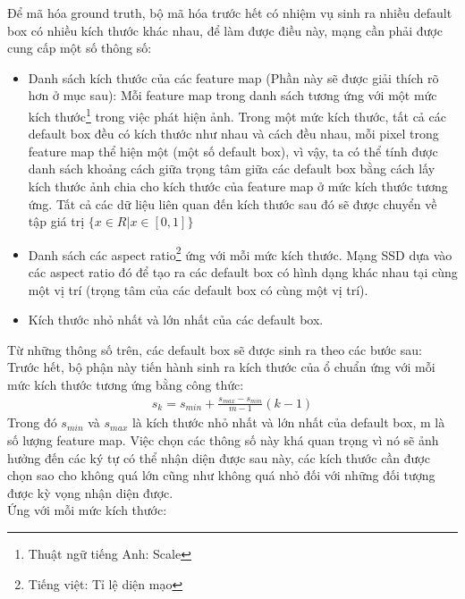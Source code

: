 \documentclass[a4paper,12pt]{article}
\begin{document}
	Để mã hóa ground truth, bộ mã hóa trước hết có nhiệm vụ sinh ra nhiều default box có nhiều kích thước khác nhau, để làm được điều này, mạng cần phải được cung cấp một số thông số:\\
	\begin{itemize}
		\item Danh sách kích thước của các feature map (Phần này sẽ được giải thích rõ hơn ở mục sau): Mỗi feature map trong danh sách tương ứng với một mức kích thước\footnote{Thuật ngữ tiếng Anh: Scale} trong việc phát hiện ảnh. Trong một mức kích thước, tất cả các default box đều có kích thước như nhau và cách đều nhau, mỗi pixel trong feature map thể hiện một (một số default box), vì vậy, ta có thể tính được danh sách khoảng cách giữa trọng tâm giữa các default box bằng cách lấy kích thước ảnh chia cho kích thước của feature map ở mức kích thước tương ứng. Tất cả các dữ liệu liên quan đến kích thước sau đó sẽ được chuyển về tập giá trị $\{x \in R | x \in [0, 1] \} $ 
		\item Danh sách các aspect ratio\footnote{Tiếng việt: Tỉ lệ diện mạo} ứng với mỗi mức kích thước. Mạng SSD dựa vào các aspect ratio đó để tạo ra các default box có hình dạng khác nhau tại cùng một vị trí (trọng tâm của các default box có cùng một vị trí).
		\item Kích thước nhỏ nhất và lớn nhất của các default box.
	\end{itemize} 
	
	Từ những thông số trên, các default box sẽ được sinh ra theo các bước sau: \\
	Trước hết, bộ phận này tiến hành sinh ra kích thước của ổ chuẩn ứng với mỗi mức kích thước tương ứng bằng công thức: 
	\begin{align}
	s_k = s_{min} + \frac{s_{max} - s_{min}}{m - 1}(k - 1) 
	\end{align}
	Trong đó $s_{min}$ và $s_{max}$ là kích thước nhỏ nhất và lớn nhất của default box, m là số lượng feature map. Việc chọn các thông số này khá quan trọng vì nó sẽ ảnh hưởng đến các ký tự có thể nhận diện được sau này, các kích thước cần được chọn sao cho không quá lớn cũng như không quá nhỏ đối với những đối tượng được kỳ vọng nhận diện được.\\
	
	Ứng với mỗi mức kích thước:
	
\end{document}
